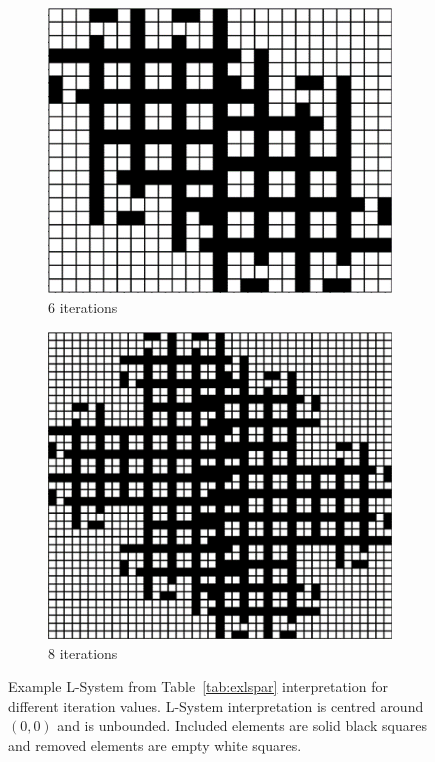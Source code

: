 \begin{figure}[H]
\begin{subfigure}[t]{0.3\textwidth}
		\includegraphics[width=\textwidth]{si_ls_6.png}
		\caption{6 iterations}
	\end{subfigure}
	\hfill
	\begin{subfigure}[t]{0.3\textwidth}
		\centering
		\includegraphics[width=\textwidth]{si_ls_8.png}
		\caption{8 iterations}
	\end{subfigure}
	\caption[Example L-System interpretation for different iteration values]{Example L-System from Table~\ref{tab:exlspar} interpretation for different iteration values. L-System interpretation is centred around $\left (0,0  \right )$ and is unbounded. Included elements are solid black squares and removed elements are empty white squares.}
	\label{fig:lsinti}
\end{figure}

